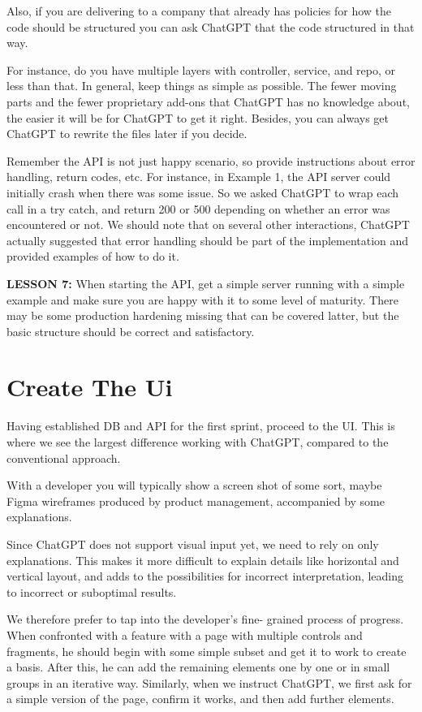 \documentclass[runningheads]{llncs}
\begin{document}
Also, if you are delivering to a company that already has policies for how the code should be structured you can ask ChatGPT that the code structured in that way.

For instance, do you have multiple layers with controller, service, and repo, or less than that. In general, keep things as simple as possible. The fewer moving parts and the fewer proprietary add-ons that ChatGPT has no knowledge about, the easier it will be for ChatGPT to get it right. Besides, you can always get ChatGPT to rewrite the 
files later if you decide.

Remember the API is not just happy scenario, so provide instructions about error handling, return codes, etc. For instance, in Example 1, the API server could initially crash when there was some issue. So we asked ChatGPT to wrap each call in a try catch, and return 200 or 500 depending on whether an error was encountered or not. We should note that on several other interactions, ChatGPT actually suggested that error handling should be part of the implementation and provided examples of how to do it.

\textbf{LESSON 7:} When starting the API, get a simple server running with a simple example and make sure you are happy with it to some level of maturity. There may be some production hardening missing that can be covered latter, but the basic structure should be correct and satisfactory.

\section{Create The Ui}
Having established DB and API for the first sprint, proceed to the UI. This is where we see the largest difference working with ChatGPT, compared to the conventional approach.

With a developer you will typically show a screen shot of some sort, maybe Figma wireframes produced by product management, accompanied by some explanations.

Since ChatGPT does not support visual input yet, we need to rely on only explanations. This makes it more difficult to explain details like horizontal and vertical layout, and adds to the possibilities for incorrect interpretation, leading to incorrect or suboptimal results.

We therefore prefer to tap into the developer's fine- grained process of progress. When confronted with a feature with a page with multiple controls and fragments, he should begin with some simple subset and get it to work to create a basis. After this, he can add the remaining elements one by one or in small groups in an iterative way.
Similarly, when we instruct ChatGPT, we first ask for a simple version of the page, confirm it works, and then add further elements.
\end{document}
